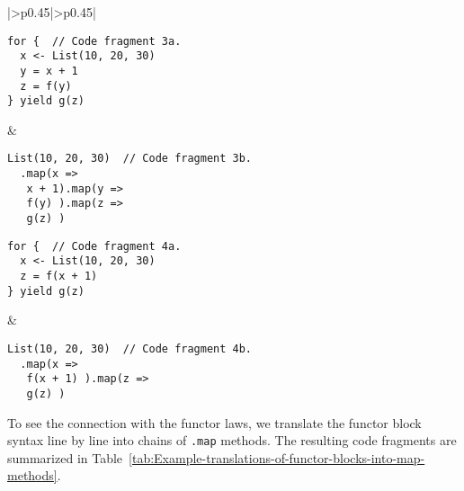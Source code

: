 \begin{table}
\begin{centering}
\begin{tabular}{|>{\centering}p{0.45\textwidth}|>{\centering}p{0.45\textwidth}|}
\begin{minipage}[t]{1.06\linewidth}%
\vspace{-0.86\baselineskip}
\begin{lstlisting}
for {  // Code fragment 3a.
  x <- List(10, 20, 30)
  y = x + 1
  z = f(y)
} yield g(z)
\end{lstlisting}
\vspace{-0.25\baselineskip}
%
\end{minipage} & \hspace*{-0.0278\linewidth}%
\begin{minipage}[t]{1.06\linewidth}%
\vspace{-0.86\baselineskip}
\begin{lstlisting}
List(10, 20, 30)  // Code fragment 3b.
  .map(x =>
   x + 1).map(y =>
   f(y) ).map(z =>
   g(z) )
\end{lstlisting}
\vspace{-0.25\baselineskip}
%
\end{minipage}\tabularnewline
\hline 
\hspace*{-0.0278\linewidth}%
\begin{minipage}[t]{1.06\linewidth}%
\vspace{-0.86\baselineskip}
\begin{lstlisting}
for {  // Code fragment 4a.
  x <- List(10, 20, 30)
  z = f(x + 1)
} yield g(z)
\end{lstlisting}
\vspace{-0.1\baselineskip}
%
\end{minipage} & \hspace*{-0.0278\linewidth}%
\begin{minipage}[t]{1.06\linewidth}%
\vspace{-0.86\baselineskip}
\begin{lstlisting}
List(10, 20, 30)  // Code fragment 4b.
  .map(x =>
   f(x + 1) ).map(z =>
   g(z) )
\end{lstlisting}
\vspace{-0.1\baselineskip}
%
\end{minipage}\tabularnewline
\hline 
\end{tabular}
\par\end{centering}
\caption{Example translations of functor blocks into \lstinline!.map! methods.\label{tab:Example-translations-of-functor-blocks-into-map-methods}}
\end{table}

To see the connection with the functor laws, we translate the functor
block syntax line by line into chains of \lstinline!.map! methods.
The resulting code fragments are summarized in Table~\ref{tab:Example-translations-of-functor-blocks-into-map-methods}.

